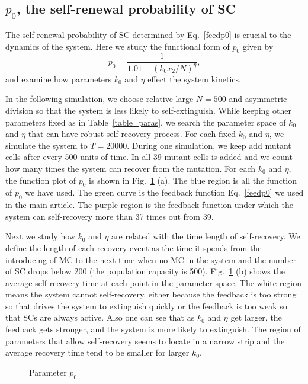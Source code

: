\documentclass[12pt]{article}
\begin{document}
\subsection*{$p_0$, the self-renewal probability of SC}
The self-renewal probability of SC determined by Eq.~\eqref{feedp0}
is crucial to the dynamics of the system. Here we study the
functional form of $p_0$ given by
$$
p_0 = \frac{1}{1.01+ (k_0 x_2 / N)^\eta},
$$
and examine how parameters $k_0$ and $\eta$ effect the system
kinetics.

In the following simulation, we choose relative large $N=500$ and
asymmetric division so that the system is less likely to 
self-extinguish. While keeping other parameters fixed as in 
Table~\ref{table_paras}, we search the parameter space of $k_0$
and $\eta$ that can have robust self-recovery process. For
each fixed $k_0$ and $\eta$, we simulate the system to $T=20000$.
During one simulation, we keep add mutant cells after every 500
units of time. In all 39 mutant cells is added and we count how
many times the system can recover from the mutation.
For each $k_0$ and $\eta$, the function plot of $p_0$
is shown in Fig.~\ref{afig_p0} (a). The blue region is
all the function of $p_0$ we have used. The green curve
is the feedback function Eq.~\eqref{feedp0} we used in the
main article. The purple region is the feedback function 
under which the system can self-recovery more than 37 times out from 39.

Next we study how $k_0$ and $\eta$ are related with the time 
length of self-recovery. We define the length of each recovery 
event as the time it spends from the introducing of MC to the 
next time when no MC in the system and the number of SC drops 
below 200 (the population capacity is 500). Fig.~\ref{afig_p0} (b) 
shows the average self-recovery time at each point 
in the parameter space. The white region means the 
system cannot self-recovery, either because the feedback 
is too strong so that drives the system to extinguish 
quickly or the feedback is too weak so that SCs are always active. 
Also one can see that as $k_0$ and $\eta$ get larger, 
the feedback gets stronger, and the system is more likely to extinguish. 
The region of parameters that allow self-recovery seems 
to locate in a narrow strip and the average recovery time 
tend to be smaller for larger $k_0$.

\begin{figure}
\centering
{}
\caption{Parameter $p_0$}
\label{afig_p0}
\end{figure}
\end{document}
